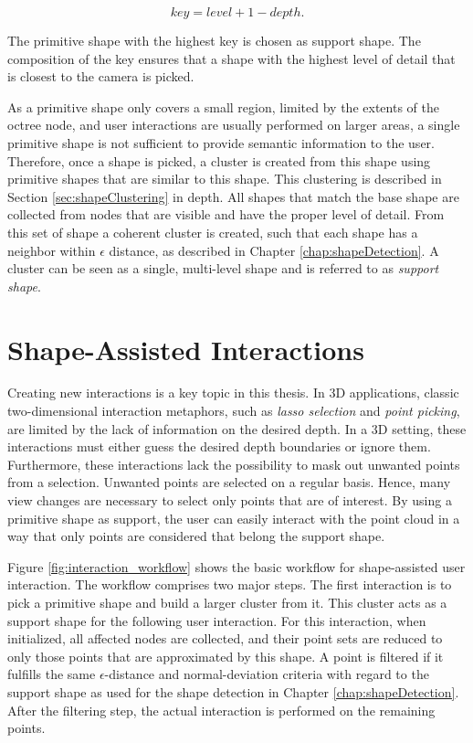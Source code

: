 $$key = level + 1 - depth.$$

The primitive shape with the highest key is chosen as support shape. The composition of the key ensures that a shape with the highest level of detail that is closest to the camera is picked. 

\par

As a primitive shape only covers a small region, limited by the extents of the octree node, and user interactions are usually performed on larger areas, a single primitive shape is not sufficient to provide semantic information to the user. Therefore, once a shape is picked, a cluster is created from this shape using primitive shapes that are similar to this shape. This clustering is described in Section \ref{sec:shapeClustering} in depth. All shapes that match the base shape are collected from nodes that are visible and have the proper level of detail. From this set of shape a coherent cluster is created, such that each shape has a neighbor within $\epsilon$ distance, as described in Chapter \ref{chap:shapeDetection}. A cluster can be seen as a single, multi-level shape and is referred to as \textit{support shape}.


\section{Shape-Assisted Interactions}
\label{sec:interactions}

Creating new interactions is a key topic in this thesis. In 3D applications, classic two-dimensional interaction metaphors, such as \textit{lasso selection} and \textit{point picking}, are limited by the lack of information on the desired depth. In a 3D setting,  these interactions must either guess the desired depth boundaries or ignore them. Furthermore, these interactions lack the possibility to mask out unwanted points from a selection. Unwanted points are selected on a regular basis. Hence, many view changes are necessary to select only points that are of interest. By using a primitive shape as support, the user can easily interact with the point cloud in a way that only points are considered that belong the support shape. 

\par

Figure \ref{fig:interaction_workflow} shows the basic workflow for shape-assisted user interaction. The workflow comprises two major steps. The first interaction is to pick a primitive shape and build a larger cluster from it. This cluster acts as a support shape for the following user interaction. For this interaction, when initialized, all affected nodes are collected, and their point sets are reduced to only those points that are approximated by this shape. A point is filtered if it fulfills the same $\epsilon$-distance and normal-deviation criteria with regard to the support shape as used for the shape detection in Chapter \ref{chap:shapeDetection}. After the filtering step, the actual interaction is performed on the remaining points. 

